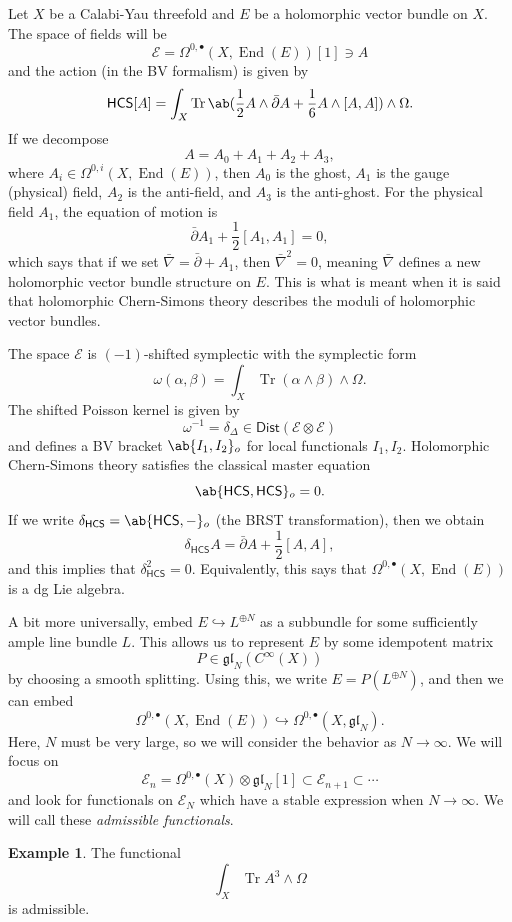 \documentclass{amsart}
\theoremstyle{definition}
\newtheorem{exm}[thm]{Example}
\theoremstyle{remark}
\theoremstyle{plain}
\theoremstyle{definition}
\theoremstyle{remark}
\newcommand{\mc}[1]{\mathcal{#1}}
\newcommand{\mf}[1]{\mathfrak{#1}}
\newcommand{\on}[1]{\operatorname{#1}}
\newcommand{\ms}[1]{\mathsf{#1}}
\newcommand{\1}{\mathbf{1}}
\newcommand{\2}{\mathbf{2}}
\newcommand{\3}{\mathbf{3}}
\newcommand{\dbar}{\bar{\partial}}
\DeclareMathOperator{\End}{End}
\begin{document}
Let \(X\) be a Calabi-Yau threefold and \(E\) be a holomorphic vector bundle on \(X\). The space of fields will be
\[ \mc{E} = \Omega^{0, \bullet}(X, \End(E))[1] \ni A \]
and the action (in the BV formalism) is given by
\[ \ms{HCS}[A] = \int_X \on{Tr} \ab(\frac{1}{2}A \wedge \dbar A + \frac{1}{6} A \wedge [A,A]) \wedge \Omega. \]
If we decompose
\[ A = A_0 + A_1 + A_2 + A_3, \]
where \(A_i \in \Omega^{0,i}(X, \End(E))\), then \(A_0\) is the ghost, \(A_1\) is the gauge (physical) field, \(A_2\) is the anti-field, and \(A_3\) is the anti-ghost. For the physical field \(A_1\), the equation of motion is
\[ \dbar A_1 + \frac{1}{2} [A_1, A_1] = 0, \]
which says that if we set \(\bar{\nabla} = \dbar + A_1\), then \(\bar{\nabla}^2 = 0\), meaning \(\bar{\nabla}\) defines a new holomorphic vector bundle structure on \(E\). This is what is meant when it is said that holomorphic Chern-Simons theory describes the moduli of holomorphic vector bundles.

The space \(\mc{E}\) is \((-1)\)-shifted symplectic with the symplectic form
\[ \omega(\alpha, \beta) = \int_X \on{Tr}(\alpha \wedge \beta) \wedge \Omega. \]
The shifted Poisson kernel is given by
\[ \omega^{-1} = \delta_{\Delta} \in \ms{Dist}(\mc{E} \otimes \mc{E}) \]
and defines a BV bracket \(\ab\{I_1, I_2\}_o\) for local functionals \(I_1, I_2\). Holomorphic Chern-Simons theory satisfies the classical master equation
\[ \ab\{ \ms{HCS}, \ms{HCS} \}_o = 0. \]
If we write \(\delta_{\ms{HCS}} = \ab\{ \ms{HCS}, -\}_o\) (the BRST transformation), then we obtain
\[ \delta_{\ms{HCS}} A = \dbar A + \frac{1}{2} [A, A], \]
and this implies that \(\delta_{\ms{HCS}}^2 = 0\). Equivalently, this says that \(\Omega^{0, \bullet}(X, \End(E))\) is a dg Lie algebra.

A bit more universally, embed \(E \hookrightarrow L^{\oplus N}\) as a subbundle for some sufficiently ample line bundle \(L\). This allows us to represent \(E\) by some idempotent matrix
\[ P \in \mf{gl}_N(C^{\infty}(X)) \]
by choosing a smooth splitting. Using this, we write \(E = P(L^{\oplus N})\), and then we can embed
\[ \Omega^{0, \bullet}(X, \End(E)) \hookrightarrow \Omega^{0, \bullet}(X, \mf{gl}_N). \]
Here, \(N\) must be very large, so we will consider the behavior as \(N \to \infty\). We will focus on
\[ \mc{E}_n = \Omega^{0, \bullet}(X) \otimes \mf{gl}_N [1] \subset \mc{E}_{n+1} \subset \cdots \]
and look for functionals on \(\mc{E}_N\) which have a stable expression when \(N \to \infty\). We will call these \textit{admissible functionals}.

\begin{exm}
    The functional
    \[ \int_X \on{Tr} A^3 \wedge \Omega \]
    is admissible.
\end{exm}
\end{document}
